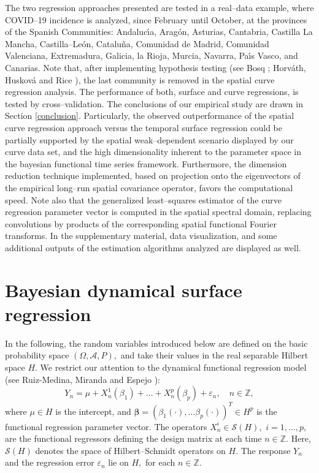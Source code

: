\documentclass[11pt,a4paper]{article}
\begin{document}
The two regression  approaches presented are tested  in a real--data example, where
  COVID--19
incidence is analyzed,  since February until October,  at the provinces of the
Spanish Communities: Andaluc\'{\i}a, Arag\'on, Asturias, Cantabria, Castilla La Mancha, Castilla--Le\'on, Catalu\~na, Comunidad de Madrid, Comunidad Valenciana, Extremadura, Galicia, la Rioja, Murcia, Navarra, Pa\'{\i}s Vasco, and Canarias.  Note that, after implementing hypothesis testing (see Bosq \cite{Bosq00}; Horv\'ath, Huskov\'a and  Rice \cite{Horvathetal13}), the last community is removed in  the  spatial curve regression analysis. The performance of both, surface and curve regressions, is tested by cross--validation.   The conclusions of our empirical study are drawn in Section \ref{conclusion}. Particularly, the observed  outperformance  of the spatial curve regression approach versus the temporal surface regression could be partially supported by the spatial weak--dependent scenario  displayed by our curve data set, and the high dimensionality inherent to the parameter space  in the bayesian functional time series framework. Furthermore, the  dimension reduction  technique implemented, based on projection onto the  eigenvectors  of the  empirical long--run spatial covariance operator, favors the computational speed. Note also that  the generalized least--squares estimator of the curve regression parameter vector is computed in the spatial spectral domain, replacing  convolutions by products of the corresponding spatial functional Fourier transforms. In the supplementary material, data visualization, and  some additional outputs of the estimation algorithms analyzed are displayed as well.







\section{Bayesian dynamical surface regression}
In the following, the  random variables introduced below are defined on  the basic probability space
 $(\Omega,\mathcal{A},P),$  and take their values  in the real separable Hilbert space $H.$
We restrict our attention to  the  dynamical functional regression model  (see Ruiz-Medina,  Miranda and  Espejo \cite{RuizMedinaMirandaEspejo19}):
\begin{equation}
Y_{n} =\mu+ X_{n}^{1}(\beta_{1}) +\dots + X_{n}^{p}(\beta_{p})+\varepsilon_{n},\quad n\in \mathbb{Z},
\label{modelreg}
\end{equation}
\noindent where $\mu \in H$ is the intercept, and   $\boldsymbol{\beta}=(\beta_{1}(\cdot),\dots \beta_{p}(\cdot))^{T}\in H^{p}$  is the functional regression parameter vector.  The operators $X_{n}^{i}\in \mathcal{S}(H),$  $i=1,\dots,p,$ are the functional regressors defining  the design matrix at each time  $n\in \mathbb{Z}.$  Here, $\mathcal{S}(H)$  denotes the space of Hilbert--Schmidt operators on $H.$ The  response $Y_{n}$ and the regression error  $\varepsilon_{n}$ lie on $H,$  for each $n\in \mathbb{Z}.$
\end{document}
